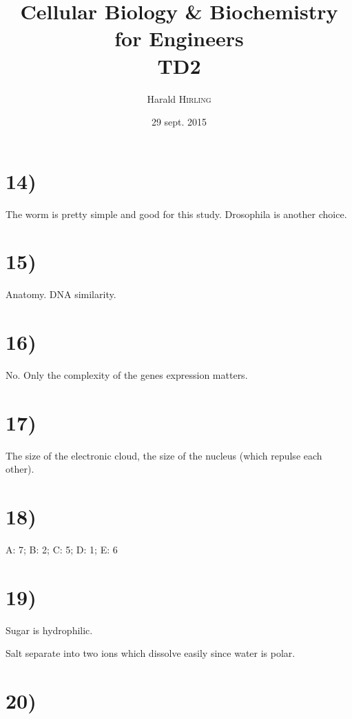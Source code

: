 

\title{Cellular Biology \& Biochemistry for Engineers\\TD2}
\author{Harald \textsc{Hirling}}
\date{29 sept. 2015}


\maketitle

\section*{14)}

The worm is pretty simple and good for this study. Drosophila is another choice.

\section*{15)}

Anatomy. DNA similarity.

\section*{16)}

No. Only the complexity of the genes expression matters.

\section*{17)}

The size of the electronic cloud, the size of the nucleus (which repulse each other).

\section*{18)}
A: 7; 
B: 2; 
C: 5; 
D: 1;
E: 6

\section*{19)}

Sugar is hydrophilic.

Salt separate into two ions which dissolve easily since water is polar.

\section*{20)}

